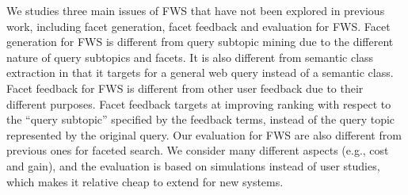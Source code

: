 We studies three main issues of FWS that have not been explored in previous work, including facet generation, facet feedback and evaluation for FWS. Facet generation for FWS is different from query subtopic mining due to the different nature of query subtopics and facets. It is also different from semantic class extraction in that it targets for a general web query instead of a semantic class. Facet feedback for FWS is different from other user feedback due to their different purposes. Facet feedback targets at improving ranking with respect to the ``query subtopic'' specified by the feedback terms, instead of the query topic represented by the original query. Our evaluation for FWS are also different from previous ones for faceted search. We consider many different aspects (e.g., cost and gain), and the evaluation is based on simulations instead of user studies, which makes it relative cheap to extend for new systems.
